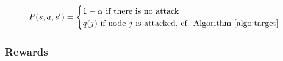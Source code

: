 
    
\begin{equation}
    P(s,a,s') = \begin{cases}
        1-\alpha \text{ if there is no attack}\\
        q(j)\text{ if node $j$ is attacked, cf. Algorithm~\ref{algo:target}}
    \end{cases}
\end{equation}
\subsubsection{Rewards}

